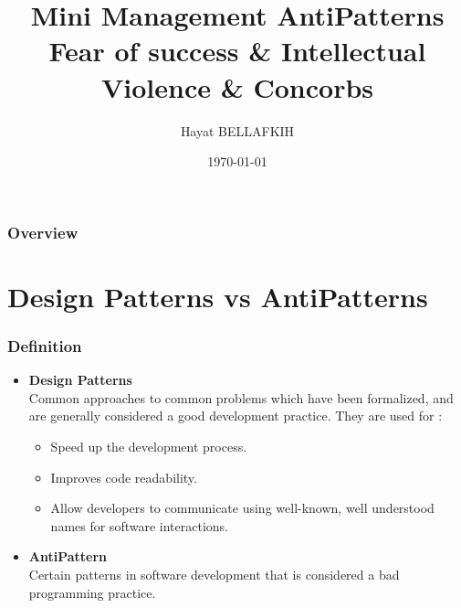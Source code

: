 \documentclass{beamer}
\title[]{Mini Management	AntiPatterns \\ Fear of success \& Intellectual Violence  \& Concorbs} %
\author{Hayat BELLAFKIH} %
\institute[UMONS] %
{
University of Mons\\ %
\medskip
\textit{hayat.BELLAFKIH@student.umons.ac.be} %
}
\date{\today} %
\begin{document}
\begin{frame}
\titlepage %
\end{frame}

\begin{frame}
\frametitle{Overview} %
\tableofcontents[hideallsubsections] %
\end{frame}


\section{Design Patterns vs AntiPatterns} %
\begin{frame}
\frametitle{Definition}
\begin{itemize}
\color{black}
\item \textbf{Design Patterns}\\
Common approaches to common problems which have been formalized, and are generally considered a good development practice. They are used for :\\
\begin{minipage}[t]{11cm}
\begin{itemize}
\item Speed up the development process.
\item Improves code readability.
\item Allow developers to communicate using well-known, well understood names for software interactions.
\end{itemize}
\end{minipage}
\newline
\item \textbf{AntiPattern}\\ 
Certain patterns in software development that is considered a bad programming practice.
\end{itemize}
\end{frame}
\end{document}
